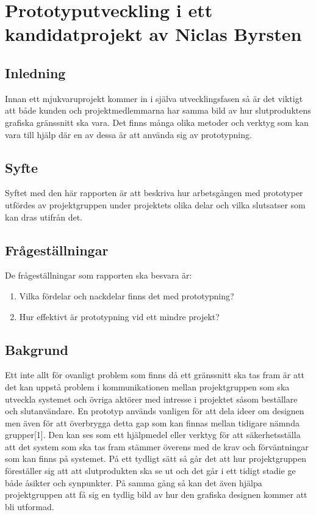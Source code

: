 \chapter{Prototyputveckling i ett kandidatprojekt av Niclas Byrsten}\label{appendix:prototyp}

\section{Inledning}
Innan ett mjukvaruprojekt kommer in i själva utvecklingsfasen så är det viktigt att både kunden och projektmedlemmarna har samma bild av hur slutproduktens grafiska gränssnitt ska vara. Det finns många olika metoder och verktyg som kan vara till hjälp där en av dessa är att använda sig av prototypning.   

\section{Syfte}
Syftet med den här rapporten är att beskriva hur arbetsgången med prototyper utfördes av projektgruppen under projektets olika delar och vilka slutsatser som kan dras utifrån det.   

\section{Frågeställningar}
De frågeställningar som rapporten ska besvara är:
\begin{enumerate}
	\item Vilka fördelar och nackdelar finns det med prototypning?
	\item Hur effektivt är prototypning vid ett mindre projekt?
\end{enumerate}

\section{Bakgrund}
Ett inte allt för ovanligt problem som finns då ett gränssnitt ska tas fram är att det kan uppstå problem i kommunikationen mellan projektgruppen som ska utveckla systemet och övriga aktörer med intresse i projektet såsom beställare och slutanvändare. En prototyp används vanligen för att dela ideer om designen men även för att överbrygga detta gap som kan finnas mellan tidigare nämnda grupper[1]. Den kan ses som ett hjälpmedel eller verktyg för att säkerhetsställa att det system som ska tas fram stämmer överens med de krav och förväntningar som kan finns på systemet. På ett tydligt sätt så går det att hur projektgruppen föreställer sig att att slutprodukten ska se ut och det går i ett tidigt stadie ge både åsikter och synpunkter. På samma gång så kan det även hjälpa projektgruppen att få sig en tydlig bild av hur den grafiska designen kommer att bli utformad.

